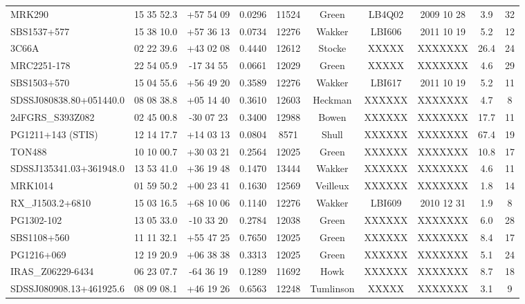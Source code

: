 \documentclass[iop]{emulateapj-rtx4}
\begin{document}
\begin{table}[ht]
\begin{center}
\begin{tabular}{l c c c c c c c c c}
\\
 MRK290					& 15 35 52.3  &  +57 54 09  &  0.0296  & 11524 & Green       & LB4Q02 & 2009 10 28 &   3.9 &  32  \\
 SBS1537+577 			& 15 38 10.0  &  +57 36 13  &  0.0734  & 12276 & Wakker     & LBI606   & 2011 10 19 &   5.2 &  12  \\
 3C66A 					& 02 22 39.6  &  +43 02 08  &  0.4440  & 12612 & Stocke	     & XXXXX   &  XXXXXXX  & 26.4 &  24  \\
 MRC2251-178 			& 22 54 05.9  &  -17 34 55   &  0.0661  & 12029 & Green       & XXXXX   & XXXXXXX   &   4.6 &  29  \\
 SBS1503+570 			& 15 04 55.6  &  +56 49 20  &  0.3589  & 12276 & Wakker     & LBI617   & 2011 10 19 &   5.2 & 11  \\
 SDSSJ080838.80+051440.0 	& 08 08 38.8  &  +05 14 40  &  0.3610  & 12603 & Heckman & XXXXXX & XXXXXXX  &    4.7 &  8  \\
 2dFGRS\_S393Z082 		& 02 45 00.8  &  -30 07 23   &  0.3400  & 12988 & Bowen      & XXXXXX & XXXXXXX  & 17.7 & 11  \\ 
 PG1211+143 (STIS)		& 12 14 17.7  &  +14 03 13  &  0.0804  &  8571 & Shull           & XXXXXX & XXXXXXX  & 67.4 &  19  \\ 
 TON488 					& 10 10 00.7  &  +30 03 21  &  0.2564  & 12025 & Green       & XXXXXX & XXXXXXX  &  10.8  &  17  \\
 SDSSJ135341.03+361948.0 	& 13 53 41.0  &  +36 19 48  &  0.1470  & 13444 & Wakker     & XXXXXX & XXXXXXX  &     4.6 &  11  \\
 MRK1014 				& 01 59 50.2  &  +00 23 41  &  0.1630  &12569 & Veilleux     & XXXXXX & XXXXXXX  &     1.8 &  14  \\
 RX\_J1503.2+6810 	 		& 15 03 16.5  &  +68 10 06  &  0.1140  & 12276 & Wakker     & LBI609   & 2010 12 31 &     1.9 &  8  \\
 PG1302-102 				& 13 05 33.0  &  -10 33 20   &  0.2784  & 12038 & Green	     & XXXXXX & XXXXXXX  &     6.0 &  28  \\
 SBS1108+560 			& 11 11 32.1  &  +55 47 25  &  0.7650  & 12025 & Green	     & XXXXXX & XXXXXXX  &     8.4 & 17  \\
 PG1216+069				& 12 19 20.9  &  +06 38 38  &  0.3313 & 12025	 & Green	     & XXXXXX & XXXXXXX  &     5.1 &  24  \\
 IRAS\_Z06229-6434 		& 06 23 07.7  &  -64 36 19   &  0.1289 & 11692	 & Howk	     & XXXXXX & XXXXXXX  &     8.7 &  18  \\
 SDSSJ080908.13+461925.6 	& 08 09 08.1  &  +46 19 26  &  0.6563 & 12248	 & Tumlinson & XXXXX   & XXXXXXX  & 	  3.1 &  9  \\

\end{tabular}
\end{center}
\end{table}
\end{document}
